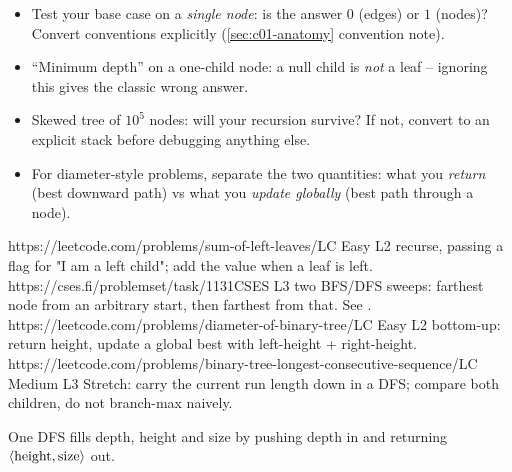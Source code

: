 \begin{stuckbox}
\begin{itemize}[nosep, leftmargin=1.4em]
  \item Test your base case on a \emph{single node}: is the answer $0$ (edges) or $1$
        (nodes)? Convert conventions explicitly (\ref{sec:c01-anatomy} convention note).
  \item ``Minimum depth'' on a one-child node: a null child is \emph{not} a leaf --
        ignoring this gives the classic wrong answer.
  \item Skewed tree of $10^5$ nodes: will your recursion survive? If not, convert to an
        explicit stack before debugging anything else.
  \item For diameter-style problems, separate the two quantities: what you \emph{return}
        (best downward path) vs what you \emph{update globally} (best path through a node).
\end{itemize}
\end{stuckbox}

\begin{practiceset}
    {https://leetcode.com/problems/sum-of-left-leaves/}{LC Easy L2}
    {recurse, passing a flag for "I am a left child"; add the value when a leaf is left.}
    {https://cses.fi/problemset/task/1131}{CSES L3}
    {two BFS/DFS sweeps: farthest node from an arbitrary start, then farthest from that. See .}
    {https://leetcode.com/problems/diameter-of-binary-tree/}{LC Easy L2}
    {bottom-up: return height, update a global best with left-height + right-height.}
    {https://leetcode.com/problems/binary-tree-longest-consecutive-sequence/}{LC Medium L3}
    {Stretch: carry the current run length down in a DFS; compare both children, do not branch-max naively.}
\end{practiceset}

\begin{recallbox}
One DFS fills depth, height and size by pushing depth in and returning
$\langle\operatorname{height},\operatorname{size}\rangle$ out.
\end{recallbox}

